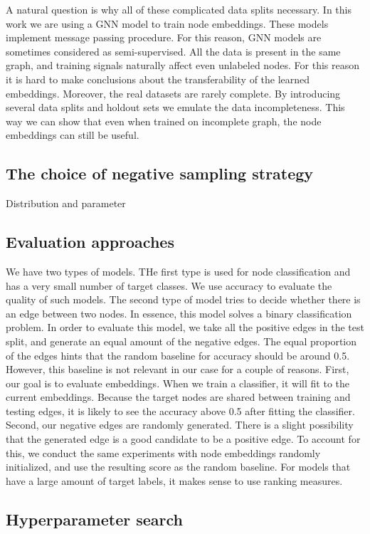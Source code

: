 \documentclass[a4paper,twoside]{article}
\begin{document}
A natural question is why all of these complicated data splits necessary. In this work we are using a GNN model to train node embeddings. These models implement message passing procedure. For this reason, GNN models are sometimes considered as semi-supervised. All the data is present in the same graph, and training signals naturally affect even unlabeled nodes. For this reason it is hard to make conclusions about the transferability of the learned embeddings. Moreover, the real datasets are rarely complete. By introducing several data splits and holdout sets we emulate the data incompleteness. This way we can show that even when trained on incomplete graph, the node embeddings can still be useful.

\subsection{The choice of negative sampling strategy}

Distribution and parameter

\subsection{Evaluation approaches}

We have two types of models. THe first type is used for node classification and has a very small number of target classes. We use accuracy to evaluate the quality of such models. The second type of model tries to decide whether there is an edge between two nodes. In essence, this model solves a binary classification problem. In order to evaluate this model, we take all the positive edges in the test split, and generate an equal amount of the negative edges. The equal proportion of the edges hints that the random baseline for accuracy should be around 0.5. However, this baseline is not relevant in our case for a couple of reasons. First, our goal is to evaluate embeddings. When we train a classifier, it will fit to the current embeddings. Because the target nodes are shared between training and testing edges, it is likely to see the accuracy above 0.5 after fitting the classifier. Second, our negative edges are randomly generated. There is a slight possibility that the generated edge is a good candidate to be a positive edge. To account for this, we conduct the same experiments with node embeddings randomly initialized, and use the resulting score as the random baseline.
For models that have a large amount of target labels, it makes sense to use ranking measures. 

\subsection{Hyperparameter search}



{\small
}
\end{document}
